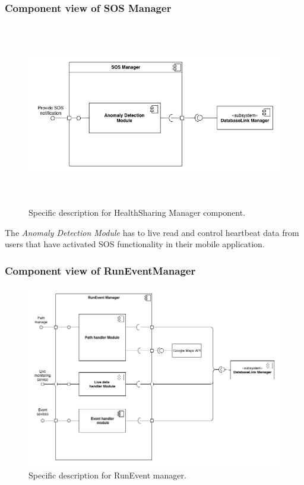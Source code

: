 \documentclass[DD.tex]{subfiles}
\begin{document}
\subsubsection{Component view of SOS Manager}
\begin{figure}[h!]
	\centering
	\includegraphics[height=8.00cm,keepaspectratio]{Figures/SOSManagerComponent}
	\caption{Specific description for HealthSharing Manager component.}
\end{figure}

The \textit{Anomaly Detection Module} has to live read and control heartbeat data from users that have activated SOS functionality in their mobile application.
\newpage


\subsubsection{Component view of RunEventManager}
\begin{figure}[h!]
	\centering
	\includegraphics[height=8.00cm,keepaspectratio]{Figures/RunEventManagerComponent}
	\caption{Specific description for RunEvent manager.}
\end{figure}
\end{document}
